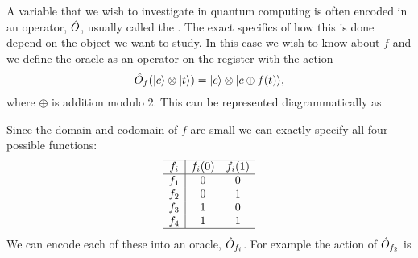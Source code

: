     A variable that we wish to investigate in quantum computing is often encoded in an operator, \(\hat{O}\), usually called the .
    The exact specifics of how this is done depend on the object we want to study.
    In this case we wish to know about \(f\) and we define the oracle as an operator on the register with the action
    \[\hat{O}_f (\vert {c} \rangle\otimes\vert {t} \rangle) = \vert {c} \rangle\otimes\vert {c \oplus f(t)} \rangle,\]
    where \(\oplus\) is addition modulo 2.
    This can be represented diagrammatically as
    \begin{center}
    \end{center}
    Since the domain and codomain of \(f\) are small we can exactly specify all four possible functions:
    \[
        \begin{array}{c|cc}\hline
            f_i & f_i(0) & f_i(1)\\\hline
            f_1 & 0 & 0\\
            f_2 & 0 & 1\\
            f_3 & 1 & 0\\
            f_4 & 1 & 1\\\hline
        \end{array}
    \]
    We can encode each of these into an oracle, \(\hat{O}_{f_i}\).
    For example the action of \(\hat{O}_{f_2}\) is
